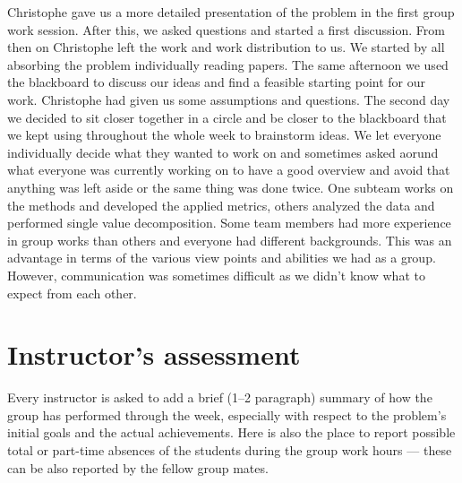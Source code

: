 \documentclass[12pt, sumlimits, intlimits]{article}
\begin{document}
Christophe gave us a more detailed presentation of the problem in the first group work session. After this, we asked questions and started a first discussion. From then on Christophe left the work and work distribution to us. We started by all absorbing the problem individually reading papers. The same afternoon we used the blackboard to discuss our ideas and find a feasible starting point for our work. Christophe had given us some assumptions and questions. The second day we decided to sit closer together in a circle and be closer to the blackboard that we kept using throughout the whole week to brainstorm ideas. 
We let everyone individually decide what they wanted to work on and sometimes asked aorund what everyone was currently working on to have a good overview and avoid that anything was left aside or the same thing was done twice. One subteam works on the methods and developed the applied metrics, others analyzed the data and performed single value decomposition.
Some team members had more experience in group works than others and everyone had different backgrounds. This was an advantage in terms of the various view points and abilities we had as a group. However, communication was sometimes difficult as we didn't know what to expect from each other.

\section{Instructor's assessment}

Every instructor is asked to add a brief (1--2 paragraph) summary of how the
group has performed through the week, especially with respect to the problem's
initial goals and the actual achievements. Here is also the place to report
possible total or part-time absences of the students during the group work
hours --- these can be also reported by the fellow group mates.

\clearpage

\thispagestyle{empty}


\printbibliography
%  
%   
\end{document}
